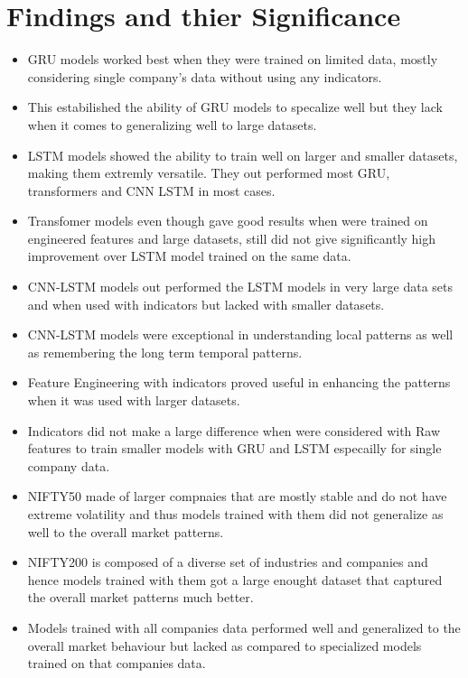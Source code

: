 \section{Findings and thier Significance}

\begin{itemize}
  \item GRU models worked best when they were trained on limited data, mostly considering single company's data without using any indicators.
  \item This estabilished the ability of GRU models to specalize well but they lack when it comes to generalizing well to large datasets.
  \item LSTM models showed the ability to train well on larger and smaller datasets, making them extremly versatile. They out performed most GRU, transformers and CNN LSTM in most cases.
  \item Transfomer models even though gave good results when were trained on engineered features and large datasets, still did not give significantly high improvement over LSTM model trained on the same data.
  \item CNN-LSTM models out performed the LSTM models in very large data sets and when used with indicators but lacked with smaller datasets.
  \item CNN-LSTM models were exceptional in understanding local patterns as well as remembering the long term temporal patterns.
  \item Feature Engineering with indicators proved useful in enhancing the patterns when it was used with larger datasets.
  \item Indicators did not make a large difference when were considered with Raw features to train smaller models with GRU and LSTM especailly for single company data.
  \item NIFTY50 made of larger compnaies that are mostly stable and do not have extreme volatility and thus models trained with them did not generalize as well to the overall market patterns.
  \item NIFTY200 is composed of a diverse set of industries and companies and hence models trained with them got a large enought dataset that captured the overall market patterns much better.
  \item Models trained with all companies data performed well and generalized to the overall market behaviour but lacked as compared to specialized models trained on that companies data.
\end{itemize}

